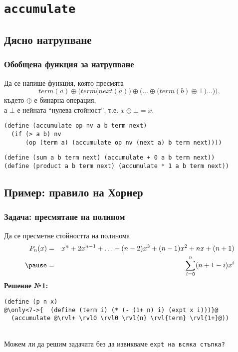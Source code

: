 \documentclass{beamer}
\begin{document}
\section{\tt{accumulate}}

\subsection{Дясно натрупване}

\begin{frame}[fragile]
  \frametitle{Обобщена функция за натрупване}

  Да се напише функция, която пресмята
  \begin{equation*}
    term(a) \oplus \bigg(term\big(next(a)\big) \oplus \Big(\ldots \oplus \big(term(b) \oplus \bot\big) \ldots\Big)\bigg),
  \end{equation*}
  където $\oplus$ е бинарна операция,\\
  а $\bot$ е нейната ``нулева стойност'', т.е. $x\oplus\bot = x$.
  \pause
  \small
\begin{lstlisting}
(define (accumulate op nv a b term next)
  (if (> a b) nv
      (op (term a) (accumulate op nv (next a) b term next))))
\end{lstlisting}
  \pause
\begin{lstlisting}
(define (sum a b term next) (accumulate + 0 a b term next))
(define (product a b term next) (accumulate * 1 a b term next))
\end{lstlisting}
\end{frame}

\subsection{Пример: правило на Хорнер}

\newcommand{\pnx}{x^n + 2x^{n-1} + \ldots + (n-2)x^3 + (n-1)x^2 + nx + (n+1)}

\begin{frame}[fragile]
  \frametitle{Задача: пресмятане на полином}

  Да се пресметне стойността на полинома
  \begin{eqnarray*}
  P_n(x) &=& \pnx\\
\pause   &=& \sum_{i=0}^n (n+1-i)x^i
  \end{eqnarray*}
  \pause
  \textbf{Решение №1:}
\begin{lstlisting}
(define (p n x)
@\only<7->{  (define (term i) (* (- (1+ n) i) (expt x i)))}@
  (accumulate @\rvl+ \rvl0 \rvl0 \rvl{n} \rvl{term} \rvl{1+}@))
\end{lstlisting}\ \\[1em]
  \onslide<+->
  \alert{Можем ли да решим задачата без да извикваме \tt{expt} на всяка стъпка?}
\end{frame}
\end{document}
